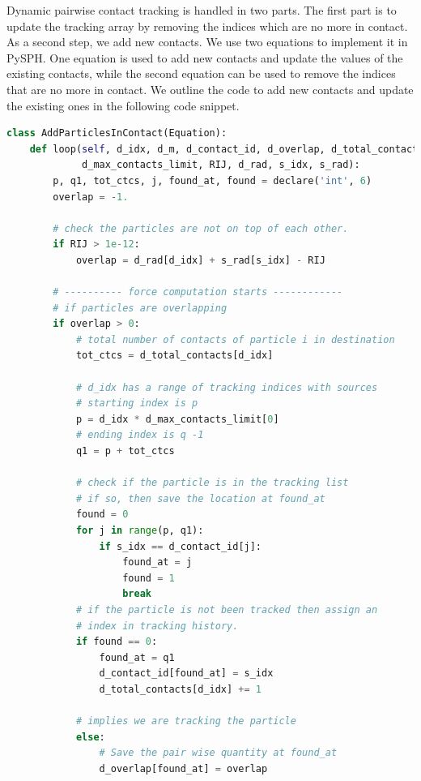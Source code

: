 Dynamic pairwise contact tracking is handled in two parts. The first part is to
update the tracking array by removing the indices which are no more in contact.
As a second step, we add new contacts. We use two equations to implement it in
PySPH. One equation is used to add new contacts and update the values of the
existing contacts, while the second equation can be used to remove the
indices that are no more in contact. We outline the code to add new contacts and
update the existing ones in the following code snippet.
 \lstset{basicstyle=\footnotesize\ttfamily}
\begin{lstlisting}[label={code:add_contacts_many},frame=lines,language=Python,upquote=True]
class AddParticlesInContact(Equation):
    def loop(self, d_idx, d_m, d_contact_id, d_overlap, d_total_contacts,
             d_max_contacts_limit, RIJ, d_rad, s_idx, s_rad):
        p, q1, tot_ctcs, j, found_at, found = declare('int', 6)
        overlap = -1.

        # check the particles are not on top of each other.
        if RIJ > 1e-12:
            overlap = d_rad[d_idx] + s_rad[s_idx] - RIJ

        # ---------- force computation starts ------------
        # if particles are overlapping
        if overlap > 0:
            # total number of contacts of particle i in destination
            tot_ctcs = d_total_contacts[d_idx]

            # d_idx has a range of tracking indices with sources
            # starting index is p
            p = d_idx * d_max_contacts_limit[0]
            # ending index is q -1
            q1 = p + tot_ctcs

            # check if the particle is in the tracking list
            # if so, then save the location at found_at
            found = 0
            for j in range(p, q1):
                if s_idx == d_contact_id[j]:
                    found_at = j
                    found = 1
                    break
            # if the particle is not been tracked then assign an
            # index in tracking history.
            if found == 0:
                found_at = q1
                d_contact_id[found_at] = s_idx
                d_total_contacts[d_idx] += 1

            # implies we are tracking the particle
            else:
                # Save the pair wise quantity at found_at
                d_overlap[found_at] = overlap
\end{lstlisting}


